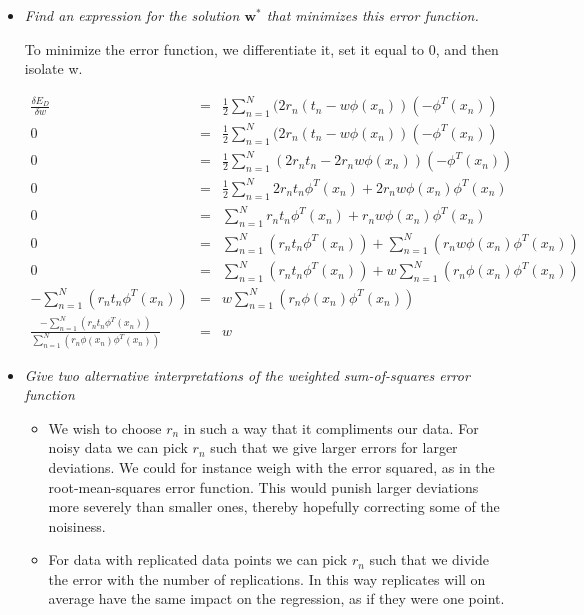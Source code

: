 \documentclass[12pt, a4paper]{article}
\begin{document}
\begin{itemize}
\item \textit{Find an expression for the solution $\textbf{w}^*$ that minimizes this error function.}

To minimize the error function, we differentiate it, set it equal to 0, and then isolate w.

\begin{eqnarray}
	\frac{\delta E_D}{\delta w} &=& \frac{1}{2}\sum^N_{n=1}(2r_n(t_n - w \phi (x_n))(-\phi^T (x_n))\\
	0 &=& \frac{1}{2}\sum^N_{n=1}(2r_n(t_n - w \phi (x_n))(-\phi^T (x_n))\\
	0 &=& \frac{1}{2}\sum^N_{n=1}(2r_nt_n - 2r_nw \phi (x_n))(-\phi^T (x_n))\\
	0 &=& \frac{1}{2}\sum^N_{n=1}2r_nt_n\phi^T (x_n) + 2r_nw \phi (x_n) \phi^T (x_n)\\	
	0 &=& \sum^N_{n=1}r_nt_n\phi^T (x_n) + r_nw \phi (x_n) \phi^T (x_n)\\
	0 &=& \sum^N_{n=1}(r_nt_n\phi^T (x_n)) + \sum^N_{n=1}(r_nw \phi (x_n) \phi^T (x_n))\\
	0 &=& \sum^N_{n=1}(r_nt_n\phi^T (x_n)) + w\sum^N_{n=1}(r_n \phi (x_n) \phi^T (x_n))\\
	-\sum^N_{n=1}(r_nt_n\phi^T (x_n)) &=& w\sum^N_{n=1}(r_n \phi (x_n) \phi^T (x_n))\\
	\frac{-\sum^N_{n=1}(r_nt_n\phi^T (x_n))}{\sum^N_{n=1}(r_n \phi (x_n) \phi^T (x_n))} &=& w
\end{eqnarray}


\item \textit{Give two alternative interpretations of the weighted sum-of-squares error function}
\begin{itemize}

	\item We wish to choose $r_n$ in such a way that it compliments our data. For noisy data we can pick $r_n$ such that we give larger errors for larger deviations. We could for instance weigh with the error squared, as in the root-mean-squares error function. This would punish larger deviations more severely than smaller ones, thereby hopefully correcting some of the noisiness. 
	\item For data with replicated data points we can pick $r_n$ such that we divide the error with the number of replications. In this way replicates will on average have the same impact on the regression, as if they were one point.
 
\end{itemize}
\end{itemize}
\end{document}
